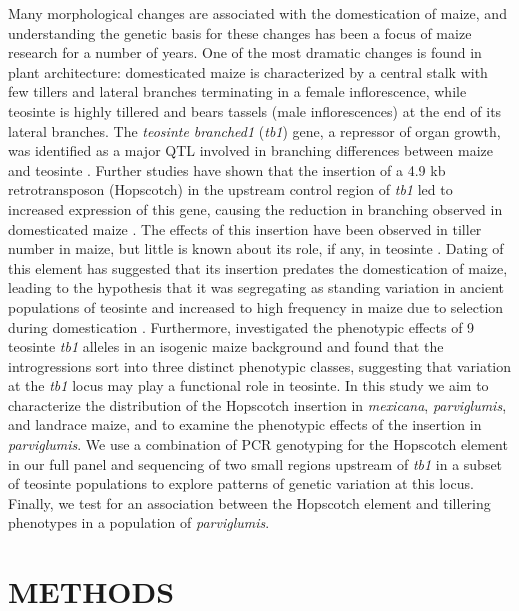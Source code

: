 \documentclass[12pt]{article}
\begin{document}
Many morphological changes are associated with the domestication of maize, and understanding the genetic basis for these changes has been a focus of maize research for a number of years. One of the most dramatic changes is found in plant architecture: domesticated maize is characterized by a central stalk with few tillers and lateral branches terminating in a female inflorescence, while teosinte is highly tillered and bears tassels (male inflorescences) at the end of its lateral branches. The \emph{teosinte branched1} (\emph{tb1}) gene, a repressor of organ growth, was identified as a major QTL involved in branching differences between maize and teosinte \cite{Doebley et al 1990, Doebley and Stec 1991, Lukens and Doebley 1999}. Further studies have shown that the insertion of a 4.9 kb retrotransposon (Hopscotch) in the upstream control region of \emph{tb1} led to increased expression of this gene, causing the reduction in branching observed in domesticated maize \cite{Studer et al 2011}. The effects of this insertion have been observed in tiller number in maize, but little is known about its role, if any, in teosinte \cite{Studer et al 2011}. Dating of this element has suggested that its insertion predates the domestication of maize, leading to the hypothesis that it was segregating as standing variation in ancient populations of teosinte and increased to high frequency in maize due to selection during domestication \cite{Studer et al 2011}. Furthermore, \cite{Studer and Doebley 2012} investigated the phenotypic effects of 9 teosinte \emph{tb1} alleles in an isogenic maize background and found that the introgressions sort into three distinct phenotypic classes, suggesting that variation at the \emph{tb1} locus may play a functional role in teosinte. In this study we aim to characterize the distribution of the Hopscotch insertion in \emph{mexicana}, \emph{parviglumis}, and landrace maize, and to examine the phenotypic effects of the insertion in \emph{parviglumis}. We use a combination of PCR genotyping for the Hopscotch element in our full panel and sequencing of two small regions upstream of \emph{tb1} in a subset of teosinte populations to explore patterns of genetic variation at this locus. Finally, we test for an association between the Hopscotch element and tillering phenotypes in a population of \emph{parviglumis}.

 
\section*{METHODS}
\end{document}
